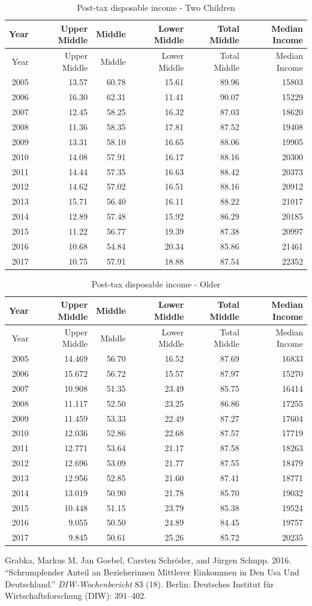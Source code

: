 \documentclass[12pt,]{article}
\begin{document}
\begin{longtable}[]{@{}rrrrrr@{}}
\caption{Post-tax disposable income - Two Children}\tabularnewline
\toprule
Year & Upper Middle & Middle & Lower Middle & Total Middle & Median
Income\tabularnewline
\midrule
\endfirsthead
\toprule
Year & Upper Middle & Middle & Lower Middle & Total Middle & Median
Income\tabularnewline
\midrule
\endhead
2005 & 13.57 & 60.78 & 15.61 & 89.96 & 15803\tabularnewline
2006 & 16.30 & 62.31 & 11.41 & 90.07 & 15229\tabularnewline
2007 & 12.45 & 58.25 & 16.32 & 87.03 & 18620\tabularnewline
2008 & 11.36 & 58.35 & 17.81 & 87.52 & 19408\tabularnewline
2009 & 13.31 & 58.10 & 16.65 & 88.06 & 19905\tabularnewline
2010 & 14.08 & 57.91 & 16.17 & 88.16 & 20300\tabularnewline
2011 & 14.44 & 57.35 & 16.63 & 88.42 & 20373\tabularnewline
2012 & 14.62 & 57.02 & 16.51 & 88.16 & 20912\tabularnewline
2013 & 15.71 & 56.40 & 16.11 & 88.22 & 21017\tabularnewline
2014 & 12.89 & 57.48 & 15.92 & 86.29 & 20185\tabularnewline
2015 & 11.22 & 56.77 & 19.39 & 87.38 & 20997\tabularnewline
2016 & 10.68 & 54.84 & 20.34 & 85.86 & 21461\tabularnewline
2017 & 10.75 & 57.91 & 18.88 & 87.54 & 22352\tabularnewline
\bottomrule
\end{longtable}

\begin{longtable}[]{@{}rrrrrr@{}}
\caption{Post-tax disposable income - Older}\tabularnewline
\toprule
Year & Upper Middle & Middle & Lower Middle & Total Middle & Median
Income\tabularnewline
\midrule
\endfirsthead
\toprule
Year & Upper Middle & Middle & Lower Middle & Total Middle & Median
Income\tabularnewline
\midrule
\endhead
2005 & 14.469 & 56.70 & 16.52 & 87.69 & 16833\tabularnewline
2006 & 15.672 & 56.72 & 15.57 & 87.97 & 15270\tabularnewline
2007 & 10.908 & 51.35 & 23.49 & 85.75 & 16414\tabularnewline
2008 & 11.117 & 52.50 & 23.25 & 86.86 & 17255\tabularnewline
2009 & 11.459 & 53.33 & 22.49 & 87.27 & 17604\tabularnewline
2010 & 12.036 & 52.86 & 22.68 & 87.57 & 17719\tabularnewline
2011 & 12.771 & 53.64 & 21.17 & 87.58 & 18263\tabularnewline
2012 & 12.696 & 53.09 & 21.77 & 87.55 & 18479\tabularnewline
2013 & 12.956 & 52.85 & 21.60 & 87.41 & 18771\tabularnewline
2014 & 13.019 & 50.90 & 21.78 & 85.70 & 19032\tabularnewline
2015 & 10.448 & 51.15 & 23.79 & 85.38 & 19524\tabularnewline
2016 & 9.055 & 50.50 & 24.89 & 84.45 & 19757\tabularnewline
2017 & 9.845 & 50.61 & 25.26 & 85.72 & 20235\tabularnewline
\bottomrule
\end{longtable}

\hypertarget{refs}{}
\hypertarget{ref-grabka2016schrumpfender}{}
Grabka, Markus M, Jan Goebel, Carsten Schröder, and Jürgen Schupp. 2016.
``Schrumpfender Anteil an Bezieherinnen Mittlerer Einkommen in Den Usa
Und Deutschland.'' \emph{DIW-Wochenbericht} 83 (18). Berlin: Deutsches
Institut für Wirtschaftsforschung (DIW): 391--402.
\end{document}
